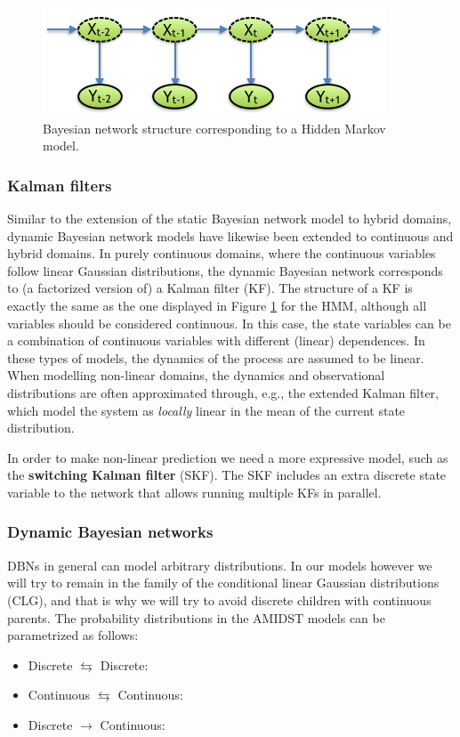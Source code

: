 \begin{figure}
\begin{center}
\includegraphics[scale=0.56]{./figures/HMM}
\caption{\label{Figure:HMM}Bayesian network structure corresponding to a Hidden Markov model.}
\end{center}
\end{figure}

\subsubsection*{Kalman filters}
Similar to the extension of the static Bayesian network model to hybrid domains, dynamic Bayesian network models have likewise been extended to continuous and hybrid domains. In purely continuous domains, where the continuous variables follow linear Gaussian distributions, the dynamic Bayesian network corresponds to (a factorized version of) a Kalman filter (KF). The structure of a KF is exactly the same as the one displayed in Figure \ref{Figure:HMM} for the HMM, although all variables should be considered continuous. In this case, the state variables can be a combination of continuous variables with different (linear) dependences. In these types of models, the dynamics of the process are assumed to be linear. When modelling non-linear domains, the dynamics and observational distributions are often approximated through, e.g., the extended Kalman filter, which model the system as \textit{locally} linear in the mean of the current state distribution. 

In order to make non-linear prediction we need a more expressive model, such as the \textbf{switching Kalman filter} (SKF). The SKF includes an extra discrete state variable to the network that allows running multiple KFs in parallel. 

\subsubsection*{Dynamic Bayesian networks}

DBNs in general can model arbitrary distributions. In our models however we will try to remain in the family of the conditional linear Gaussian distributions (CLG), and that is why we will try to avoid discrete children with continuous parents. The probability distributions in the AMIDST models can be parametrized as follows:
\begin{itemize}
\item Discrete $\leftrightarrows$ Discrete:
\item Continuous $\leftrightarrows$ Continuous:
\item Discrete $\rightarrow$ Continuous:
\end{itemize}


